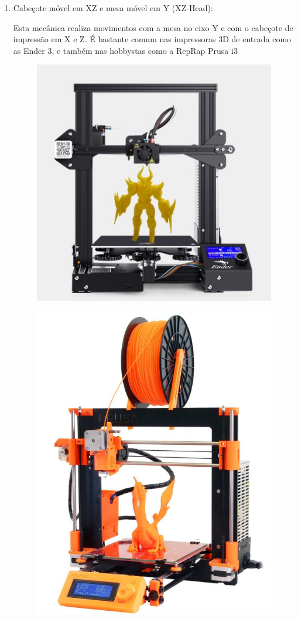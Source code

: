 \documentclass[12pt, english]{article}
\begin{document}
\begin{enumerate}[leftmargin=*, listparindent=0.7cm]
	\item {
	Cabeçote móvel em XZ e mesa móvel em Y (XZ-Head):

	Esta mecânica realiza movimentos com a mesa no eixo Y e com o cabeçote de impressão em X e Z. É bastante comum nas impressoras 3D de entrada como as Ender 3, e também nas hobbystas como a RepRap Prusa i3


	\begin{figure}[H]
		\centering
		\begin{minipage}{.5\textwidth}
			\centering
			\includegraphics[height=.8\linewidth]{Ender3.png}
			\label{fig:test1}
		\end{minipage}%
		\begin{minipage}{.5\textwidth}
			\centering
			\includegraphics[height=.8\linewidth]{PrusaI3.png}
			\label{fig:test2}
		\end{minipage}
	\end{figure}

}
\end{enumerate}
\end{document}
